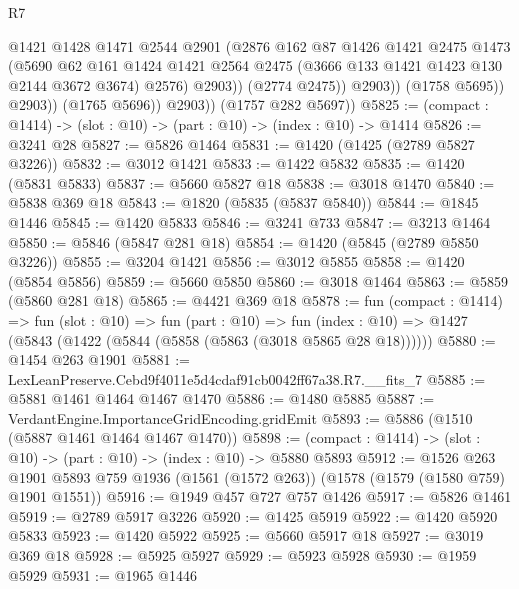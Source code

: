 \begin{lexlean}{R7}
\begin{coremodule}
                          @1421
                          @1428
                          @1471
                          @2544
                          @2901
                          (@2876
                            @162
                            @87
                            @1426
                            @1421
                            @2475
                            @1473
                            (@5690
                              @62
                              @161
                              @1424
                              @1421
                              @2564
                              @2475
                              (@3666 @133 @1421 @1423 @130 @2144 @3672 @3674)
                              @2576)
                            @2903))
                        (@2774 @2475))
                      @2903))
                  (@1758 @5695))
                @2903))
            (@1765 @5696))
          @2903))
      (@1757 @282 @5697))
@5825 := (compact : @1414) -> (slot : @10) -> (part : @10) -> (index : @10) -> @1414
@5826 := @3241 @28
@5827 := @5826 @1464
@5831 := @1420 (@1425 (@2789 @5827 @3226))
@5832 := @3012 @1421
@5833 := @1422 @5832
@5835 := @1420 (@5831 @5833)
@5837 := @5660 @5827 @18
@5838 := @3018 @1470
@5840 := @5838 @369 @18
@5843 := @1820 (@5835 (@5837 @5840))
@5844 := @1845 @1446
@5845 := @1420 @5833
@5846 := @3241 @733
@5847 := @3213 @1464
@5850 := @5846 (@5847 @281 @18)
@5854 := @1420 (@5845 (@2789 @5850 @3226))
@5855 := @3204 @1421
@5856 := @3012 @5855
@5858 := @1420 (@5854 @5856)
@5859 := @5660 @5850
@5860 := @3018 @1464
@5863 := @5859 (@5860 @281 @18)
@5865 := @4421 @369 @18
@5878 := fun (compact : @1414) =>
  fun (slot : @10) =>
  fun (part : @10) =>
  fun (index : @10) => @1427 (@5843 (@1422 (@5844 (@5858 (@5863 (@3018 @5865 @28 @18))))))
@5880 := @1454 @263 @1901
@5881 := LexLeanPreserve.Cebd9f4011e5d4cdaf91cb0042ff67a38.R7.__fits_7
@5885 := @5881 @1461 @1464 @1467 @1470
@5886 := @1480 @5885
@5887 := VerdantEngine.ImportanceGridEncoding.gridEmit
@5893 := @5886 (@1510 (@5887 @1461 @1464 @1467 @1470))
@5898 := (compact : @1414) -> (slot : @10) -> (part : @10) -> (index : @10) -> @5880 @5893
@5912 := @1526
    @263
    @1901
    @5893
    @759
    @1936
    (@1561 (@1572 @263))
    (@1578 (@1579 (@1580 @759) @1901 @1551))
@5916 := @1949 @457 @727 @757 @1426
@5917 := @5826 @1461
@5919 := @2789 @5917 @3226
@5920 := @1425 @5919
@5922 := @1420 @5920 @5833
@5923 := @1420 @5922
@5925 := @5660 @5917 @18
@5927 := @3019 @369 @18
@5928 := @5925 @5927
@5929 := @5923 @5928
@5930 := @1959 @5929
@5931 := @1965 @1446

\end{coremodule}
\end{lexlean}
